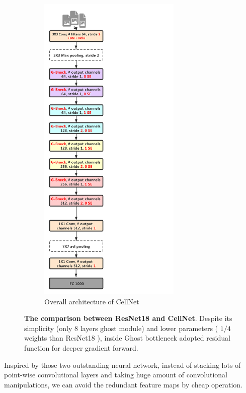 \begin{figure}[h]
\begin{center}
\begin{subfigure}[t]{0.49\textwidth}
			\includegraphics[height =6in]{thesis-template-master/images/Ghostres18.pdf}
			\caption{Overall architecture of CellNet}
			\label{fig:cellnet}
		\end{subfigure}
	\end{center}
	\caption{\textbf{The comparison between ResNet18 \cite{b20} and CellNet}. Despite its simplicity (only 8 layers ghost module) and lower parameters ( $1/4$ weights than ResNet18 \cite{b20}), inside Ghost bottleneck adopted residual function for deeper gradient forward.}
\end{figure}



Inspired by those two outstanding neural network\cite{b19}\cite{b20}, instead of stacking lots of point-wise convolutional layers and taking huge amount of convolutional manipulations, we can avoid the redundant feature maps by cheap operation. 

